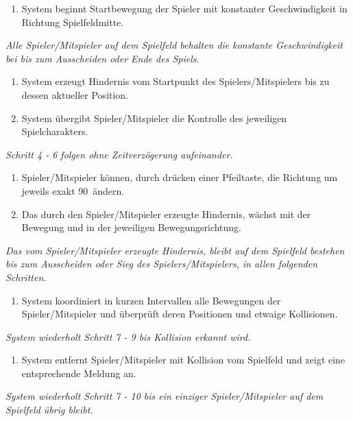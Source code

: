 \documentclass[11pt,ngerman]{article}
\begin{document}
\begin{tcolorbox}
\begin{enumerate}
                        \item System beginnt Startbewegung der Spieler mit konstanter Geschwindigkeit in Richtung Spielfeldmitte.
                    \end{enumerate}
                    \textit{Alle Spieler/Mitspieler auf dem Spielfeld behalten die konstante Geschwindigkeit bei bis zum Ausscheiden oder Ende des Spiels.}
                    \begin{enumerate}[resume]
                        \item System erzeugt Hindernis vom Startpunkt des Spielers/Mitspielers bis zu dessen aktueller Position.
                        \item System übergibt Spieler/Mitspieler die Kontrolle des jeweiligen Spielcharakters.
                    \end{enumerate}
                    \textit{Schritt 4 - 6 folgen ohne Zeitverzögerung aufeinander.}
                    \begin{enumerate}[resume]
                        \item Spieler/Mitspieler können, durch drücken einer Pfeiltaste, die Richtung um jeweils exakt 90\textdegree\ ändern.
                        \item Das durch den Spieler/Mitspieler erzeugte Hindernis, wächst mit der Bewegung und in der jeweiligen Bewegungsrichtung.
                    \end{enumerate}
                    \textit{Das vom Spieler/Mitspieler erzeugte Hindernis, bleibt auf dem Spielfeld bestehen bis zum Ausscheiden oder Sieg des Spielers/Mitspielers, in allen folgenden Schritten.}
                    \begin{enumerate}[resume]
                        \item System koordiniert in kurzen Intervallen alle Bewegungen der Spieler/Mitspieler und überprüft deren Positionen und etwaige Kollisionen.
                    \end{enumerate}
                    \textit{System wiederholt Schritt 7 - 9 bis Kollision erkannt wird.}
                    \begin{enumerate}[resume]
                        \item System entfernt Spieler/Mitspieler mit Kollision vom Spielfeld und zeigt eine entsprechende Meldung an.
                    \end{enumerate}
                    \textit{System wiederholt Schritt 7 - 10 bis ein einziger Spieler/Mitspieler auf dem Spielfeld übrig bleibt.}

\end{tcolorbox}
\end{document}
